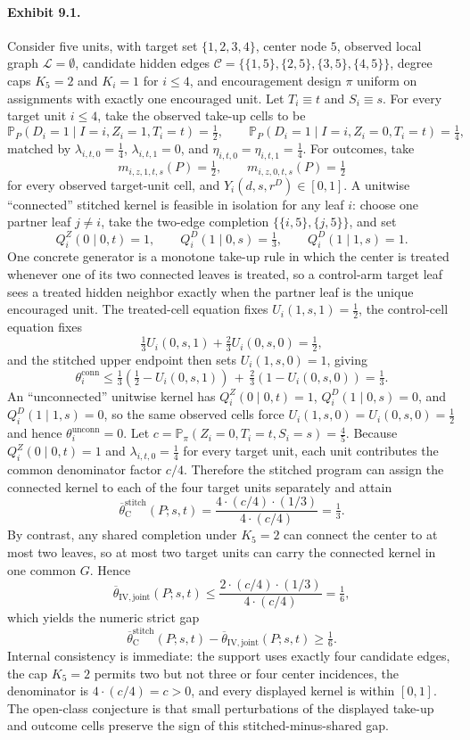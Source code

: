\documentclass[11pt]{article}
\renewcommand{\Pr}{\mathbb{P}}
\theoremstyle{definition}
\theoremstyle{plain}
\theoremstyle{remark}
\begin{document}
\paragraph{Exhibit 9.1.} Consider five units, with target set \(\{1,2,3,4\}\), center node \(5\), observed local graph \(\mathcal L=\emptyset\), candidate hidden edges \(\mathcal C=\{\{1,5\},\{2,5\},\{3,5\},\{4,5\}\}\), degree caps \(K_5=2\) and \(K_i=1\) for \(i\le4\), and encouragement design \(\pi\) uniform on assignments with exactly one encouraged unit. Let \(T_i\equiv t\) and \(S_i\equiv s\). For every target unit \(i\le4\), take the observed take-up cells to be
\[
\Pr_P(D_i=1\mid I=i,Z_i=1,T_i=t)=\tfrac12,
\qquad
\Pr_P(D_i=1\mid I=i,Z_i=0,T_i=t)=\tfrac14,
\]
matched by \(\lambda_{i,t,0}=\tfrac14\), \(\lambda_{i,t,1}=0\), and \(\eta_{i,t,0}=\eta_{i,t,1}=\tfrac14\). For outcomes, take
\[
m_{i,z,1,t,s}(P)=\tfrac12,
\qquad
m_{i,z,0,t,s}(P)=\tfrac12
\]
for every observed target-unit cell, and \(Y_i(d,s,r^D)\in[0,1]\). A unitwise ``connected'' stitched kernel is feasible in isolation for any leaf \(i\): choose one partner leaf \(j\neq i\), take the two-edge completion \(\{\{i,5\},\{j,5\}\}\), and set
\[
Q_i^Z(0\mid 0,t)=1,\qquad
Q_i^D(1\mid 0,s)=\tfrac13,\qquad
Q_i^D(1\mid 1,s)=1.
\]
One concrete generator is a monotone take-up rule in which the center is treated whenever one of its two connected leaves is treated, so a control-arm target leaf sees a treated hidden neighbor exactly when the partner leaf is the unique encouraged unit.
The treated-cell equation fixes \(U_i(1,s,1)=\tfrac12\), the control-cell equation fixes
\[
\tfrac13 U_i(0,s,1)+\tfrac23 U_i(0,s,0)=\tfrac12,
\]
and the stitched upper endpoint then sets \(U_i(1,s,0)=1\), giving
\[
\theta_i^{\mathrm{conn}}
\le
\tfrac13\!\left(\tfrac12-U_i(0,s,1)\right)
\,+\,
\tfrac23\!\left(1-U_i(0,s,0)\right)
=
\tfrac13.
\]
An ``unconnected'' unitwise kernel has \(Q_i^Z(0\mid0,t)=1\), \(Q_i^D(1\mid0,s)=0\), and \(Q_i^D(1\mid1,s)=0\), so the same observed cells force \(U_i(1,s,0)=U_i(0,s,0)=\tfrac12\) and hence \(\theta_i^{\mathrm{unconn}}=0\). Let \(c=\Pr_\pi(Z_i=0,T_i=t,S_i=s)=\tfrac45\). Because \(Q_i^Z(0\mid0,t)=1\) and \(\lambda_{i,t,0}=\tfrac14\) for every target unit, each unit contributes the common denominator factor \(c/4\). Therefore the stitched program can assign the connected kernel to each of the four target units separately and attain
\[
\overline\theta_{\mathrm{C}}^{\mathrm{stitch}}(P;s,t)=\frac{4\cdot(c/4)\cdot(1/3)}{4\cdot(c/4)}=\tfrac13.
\]
By contrast, any shared completion under \(K_5=2\) can connect the center to at most two leaves, so at most two target units can carry the connected kernel in one common \(G\). Hence
\[
\overline\theta_{\mathrm{IV,joint}}(P;s,t)\le \frac{2\cdot(c/4)\cdot(1/3)}{4\cdot(c/4)}=\tfrac16,
\]
which yields the numeric strict gap
\[
\overline\theta_{\mathrm{C}}^{\mathrm{stitch}}(P;s,t)-\overline\theta_{\mathrm{IV,joint}}(P;s,t)\ge\tfrac16.
\]
Internal consistency is immediate: the support uses exactly four candidate edges, the cap \(K_5=2\) permits two but not three or four center incidences, the denominator is \(4\cdot(c/4)=c>0\), and every displayed kernel is within \([0,1]\). The open-class conjecture is that small perturbations of the displayed take-up and outcome cells preserve the sign of this stitched-minus-shared gap.
\end{document}
